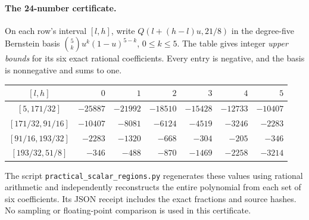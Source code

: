 \documentclass[11pt]{article}
\begin{document}
\paragraph{The 24-number certificate.}
On each row's interval $[l,h]$, write
$Q(l+(h-l)u,21/8)$ in the degree-five Bernstein basis
$\binom5k u^k(1-u)^{5-k}$, $0\le k\le5$.
The table gives integer \emph{upper bounds} for its six exact rational
coefficients. Every entry is negative, and the basis is nonnegative and
sums to one.
\begin{center}\small
\begin{tabular}{c rrrrrr}
\toprule
$[l,h]$ & $0$ & $1$ & $2$ & $3$ & $4$ & $5$\\\midrule
$[5,171/32]$ & $-25887$ & $-21992$ & $-18510$ & $-15428$ & $-12733$ & $-10407$\\
$[171/32,91/16]$ & $-10407$ & $-8081$ & $-6124$ & $-4519$ & $-3246$ & $-2283$\\
$[91/16,193/32]$ & $-2283$ & $-1320$ & $-668$ & $-304$ & $-205$ & $-346$\\
$[193/32,51/8]$ & $-346$ & $-488$ & $-870$ & $-1469$ & $-2258$ & $-3214$\\
\bottomrule
\end{tabular}
\end{center}
The script \texttt{practical\_scalar\_regions.py} regenerates these values
using rational arithmetic and independently reconstructs the entire
polynomial from each set of six coefficients. Its JSON receipt includes
the exact fractions and source hashes. No sampling or floating-point
comparison is used in this certificate.
\end{document}

